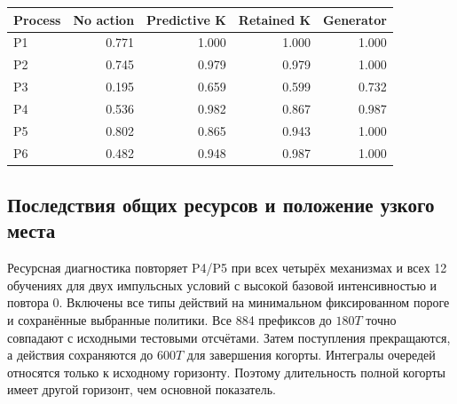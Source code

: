 \begin{center}\small\begin{tabular}{lrrrr}\toprule

Process & No action & Predictive K & Retained K & Generator\\\midrule

P1 & 0.771 & 1.000 & 1.000 & 1.000\\

P2 & 0.745 & 0.979 & 0.979 & 1.000\\

P3 & 0.195 & 0.659 & 0.599 & 0.732\\

P4 & 0.536 & 0.982 & 0.867 & 0.987\\

P5 & 0.802 & 0.865 & 0.943 & 1.000\\

P6 & 0.482 & 0.948 & 0.987 & 1.000\\

\bottomrule\end{tabular}\end{center}

\subsection{Последствия общих ресурсов и положение узкого места}

Ресурсная диагностика повторяет P4/P5 при всех четырёх механизмах и всех 12 обучениях для двух импульсных условий с высокой базовой интенсивностью и повтора 0. Включены все типы действий на минимальном фиксированном пороге и сохранённые выбранные политики. Все 884 префиксов до $180T$ точно совпадают с исходными тестовыми отсчётами. Затем поступления прекращаются, а действия сохраняются до $600T$ для завершения когорты. Интегралы очередей относятся только к исходному горизонту. Поэтому длительность полной когорты имеет другой горизонт, чем основной показатель.

